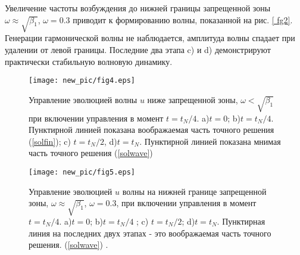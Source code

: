 Увеличение частоты возбуждения до нижней границы запрещенной зоны $ \omega \approx \sqrt {\beta_1} $, $\omega = 0.3 $ приводит к формированию волны, показанной на рис. \ref{ fg2}. Генерации гармонической волны не наблюдается, амплитуда волны спадает при удалении от левой границы. Последние два этапа c) и d) демонстрируют практически стабильную волновую динамику.
\begin{figure*}
\begin{center}
\texttt{[image: new\_pic/fig4.eps]}
\end{center}
\caption{ Управление эволюцией волны $ u $ ниже запрещенной зоны, $\omega<\sqrt{\beta_1}$ при включении управления в момент $t=t_N/4$. a)$t=0$; b)$ t=t_N/4$. Пунктирной линией показана воображаемая часть точного решения (\ref{solfin}); c) $t=t_N/2$, d)$t=t_N$. Пунктирной линией показана мнимая часть точного решения (\ref{solwave}) }
\label{fg4}
  \end{figure*}
\begin{figure*}
\begin{center}
\texttt{[image: new\_pic/fig5.eps]}
\end{center}
\caption{Управление эволюцией $ u $ волны на нижней границе запрещенной зоны, $\omega \approx \sqrt{\beta_1}$, $\omega=0.3$, при включении управления в момент $t=t_N/4$. a)$t=0$; b)$ t=t_N/4$ ; c) $t=t_N/2$; d)$t=t_N$. Пунктирная линия на последних двух этапах - это воображаемая часть точного решения. (\ref{solwave}) .}
\label{fg5}
\end{figure*}
  
